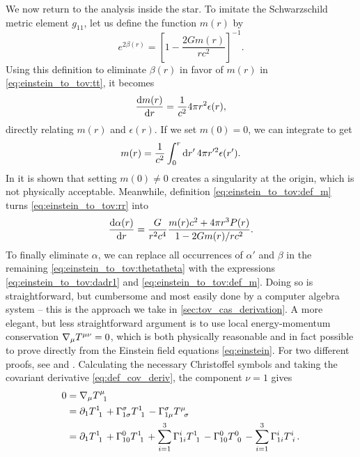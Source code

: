 We now return to the analysis inside the star.
To imitate the Schwarzschild metric element $g_{11}$, let us define the function $m(r)$ by
\begin{equation}
	e^{2 \beta(r)} = \left[ 1 - \frac{2 G m(r)}{r c^2} \right]^{-1} .
	\label{eq:einstein_to_tov:def_m}
\end{equation}
Using this definition to eliminate $\beta(r)$ in favor of $m(r)$ in \cref{eq:einstein_to_tov:tt}, it becomes
\begin{equation}
	\odv{m(r)}{r} = \frac{1}{c^2} 4 \pi r^2 \epsilon(r) ,
	\label{eq:einstein_to_tov:m_rho}
\end{equation}
directly relating $m(r)$ and $\epsilon(r)$.
If we set $m(0) = 0$, we can integrate to get
\begin{equation}
	m(r) = \frac{1}{c^2} \integral{4 \pi r'^2 \epsilon(r')}{r'}{0}{r} .
	\label{eq:einstein_to_tov:m_integral}
\end{equation}
In \cite[page 602]{ref:mtw} it is shown that setting $m(0) \neq 0$ creates a singularity at the origin, which is not physically acceptable.
Meanwhile, definition \eqref{eq:einstein_to_tov:def_m} turns \cref{eq:einstein_to_tov:rr} into
\begin{equation}
	\odv{\alpha(r)}{r} = \frac{G}{r^2 c^4} \frac{m(r) c^2 + 4 \pi r^3 P(r)}{1 - 2 G m(r) / r c^2} .
	\label{eq:einstein_to_tov:dadr1}
\end{equation}
To finally eliminate $\alpha$, we can replace all occurrences of $\alpha'$ and $\beta$ in the remaining \cref{eq:einstein_to_tov:thetatheta} with the expressions \eqref{eq:einstein_to_tov:dadr1} and \eqref{eq:einstein_to_tov:def_m}.
Doing so is straightforward, but cumbersome and most easily done by a computer algebra system -- this is the approach we take in \cref{sec:tov_cas_derivation}.
A more elegant, but less straightforward argument is to use local energy-momentum conservation $\nabla_\mu T\indices{^\mu^\nu} = 0$, which is both physically reasonable and in fact possible to prove directly from the Einstein field equations \eqref{eq:einstein}.
For two different proofs, see \cite{ref:einstein_conservation_energy_momentum} and \cite[section 8.3.2]{ref:mika_gr_notes}.
Calculating the necessary Christoffel symbols and taking the covariant derivative \eqref{eq:def_cov_deriv}, the component $\nu=1$ gives
\begin{equation}
\begin{split}
	0 &= \nabla_\mu T\indices{^\mu_1} \\
	  &= \partial_1 T\indices{^1_1} + \Gamma^\sigma_{1 \sigma} T\indices{^1_1} - \Gamma^\sigma_{1 \mu} T\indices{^\mu_\sigma} \\
	  &= \partial_1 T\indices{^1_1} + \Gamma^0_{10} T\indices{^1_1} + \sum_{i=1}^3 \Gamma^i_{1i} T\indices{^1_1} - \Gamma^0_{10} T\indices{^0_0} - \sum_{i=1}^3 \Gamma^i_{1i} T\indices{^i_i} . \\
\end{split}
\end{equation}
